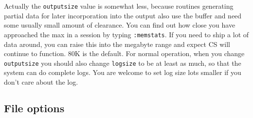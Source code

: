 \documentclass[]{article}
\begin{document}
Actually the \texttt{outputsize} value is somewhat less, because
routines generating partial data for later incorporation into the output
also use the buffer and need some usually small amount of clearance. You
can find out how close you have approached the max in a session by
typing \texttt{:memstats}. If you need to ship a lot of data around, you
can raise this into the megabyte range and expect CS will continue to
function. 80K is the default. For normal operation, when you change
\texttt{outputsize} you should also change \texttt{logsize} to be at
least as much, so that the system can do complete logs. You are welcome
to set log size lots smaller if you don't care about the log.

\subsection{File options}\label{file-options}
\end{document}
